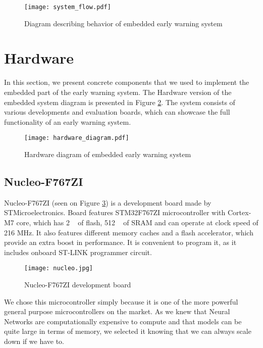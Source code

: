 \begin{figure}[ht]
        \centering
        \texttt{[image: system\_flow.pdf]} 
        \caption{ Diagram describing behavior of embedded early warning system} 
        \label{system_flow}
\end{figure}


\section{ Hardware}

In this section, we present concrete components that we used to implement the embedded part of the early warning system.
The Hardware version of the embedded system diagram is presented in Figure \ref{hardware_diagram}.
The system consists of various developments and evaluation boards, which can showcase the full functionality of an early warning system.

\begin{figure}[ht]
        \centering
        \texttt{[image: hardware\_diagram.pdf]} 
        \caption{ Hardware diagram of embedded early warning system} 
        \label{hardware_diagram}
\end{figure}


\subsection{ Nucleo-F767ZI}

Nucleo-F767ZI (seen on Figure \ref{nucleo}) is a development board made by STMicroelectronics.
Board features STM32F767ZI microcontroller with Cortex-M7 core, which has 2 \si{\mega\byte} of flash, 512 \si{\kilo\byte} of SRAM and can operate at clock speed of 216 \si{\mega\hertz}.
It also features different memory caches and a flash accelerator, which provide an extra boost in performance.
It is convenient to program it, as it includes onboard ST-LINK programmer circuit.

\begin{figure}[ht]
        \centering
        \texttt{[image: nucleo.jpg]} 
        \caption{ Nucleo-F767ZI development board} 
        \label{nucleo}
\end{figure}

We chose this microcontroller simply because it is one of the more powerful general purpose microcontrollers on the market.
As we knew that Neural Networks are computationally expensive to compute and that models can be quite large in terms of memory, we selected it knowing that we can always scale down if we have to.


